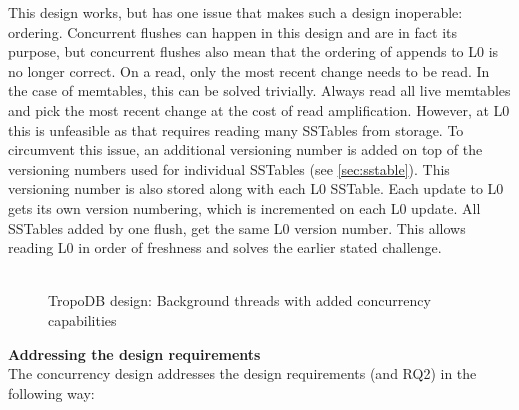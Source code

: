 This design works, but has one issue that makes such a design inoperable: ordering. Concurrent flushes can happen in this design and are in fact its purpose, but concurrent flushes also mean that the ordering of appends to L0 is no longer correct. On a read, only the most recent change needs to be read. In the case of memtables, this can be solved trivially. Always read all live memtables and pick the most recent change at the cost of read amplification. However, at L0 this is unfeasible as that requires reading many SSTables from storage. To circumvent this issue, an additional versioning number is added on top of the versioning numbers used for individual SSTables (see \autoref{sec:sstable}). This versioning number is also stored along with each L0 SSTable. Each update to L0 gets its own version numbering, which is incremented on each L0 update. All SSTables added by one flush, get the same L0 version number. This allows reading L0 in order of freshness and solves the earlier stated challenge. \\\\
\begin{figure}[h]
\centering
\begin{minipage}{0.75\textwidth}
  \centering
  
\end{minipage}%
\caption{ TropoDB design: Background threads with added concurrency capabilities }
\label{fig:bgthreadsexpanded}
\end{figure}
\textbf{Addressing the design requirements}\\
The concurrency design addresses the design requirements (and RQ2) in the following way:
